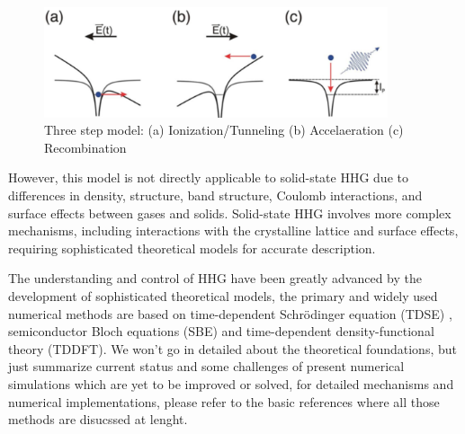 \begin{figure}[htpb]
	\centering
	\includegraphics[width=0.9\textwidth]{pic/3step.pdf}
	\caption[Lab coordinate system]{Three step model: (a) Ionization/Tunneling (b) Accelaeration (c) Recombination}
	\label{fig: 3step}
\end{figure}
However, this model is not directly applicable to solid-state HHG due to differences in density, structure, band structure, Coulomb interactions, and surface effects between gases and solids. Solid-state HHG involves more complex mechanisms, including interactions with the crystalline lattice and surface effects, requiring sophisticated theoretical models for accurate description.

The understanding and control of HHG have been greatly advanced by the development of sophisticated
theoretical models, the primary and widely used numerical methods are based on time-dependent
Schrödinger equation (\gls{TDSE}) , semiconductor Bloch equations (\gls{SBE})
and time-dependent density-functional theory (\gls{TDDFT}).
We won't go in detailed about the theoretical foundations, but just summarize current status and some challenges of present numerical simulations which are yet to be improved or solved, for detailed mechanisms and numerical implementations, please refer to the basic references where all those methods are disucssed at lenght.

